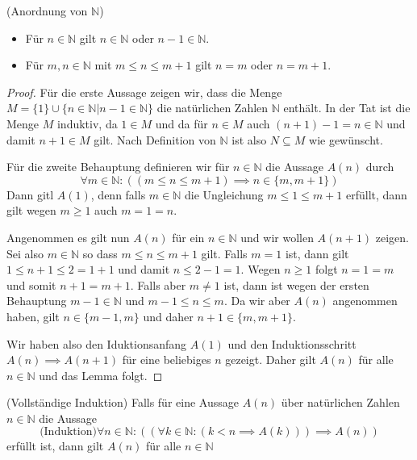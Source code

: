 \documentclass[../Analysis1_script.tex]{subfiles}
\begin{document}
\begin{lemma}{(Anordnung von $\mathbb{N}$)}\label{realn:order}
	\begin{itemize}
		\item Für $n \in \mathbb{N}$ gilt $n \in \mathbb{N}$ oder $n-1 \in \mathbb{N}$.
		\item Für $m, n \in \mathbb{N}$ mit $m \leq n \leq m+1$ gilt $n = m$ oder $n = m+1$.
	\end{itemize}
\end{lemma}

\begin{proof}
	Für die erste Aussage zeigen wir, dass die Menge $M = \{1\} \cup \{n \in \mathbb{N} | n-1 \in \mathbb{N}\}$ die natürlichen Zahlen $\mathbb{N}$ enthält. In der Tat ist die Menge $M$ induktiv, da $1 \in M$ und da für $n \in M$ auch $(n+1)-1 = n \in \mathbb{N}$ und damit $n + 1 \in M$ gilt. Nach Definition von $\mathbb{N}$ ist also $N \subseteq M$ wie gewünscht.
	
	Für die zweite Behauptung definieren wir für $n \in \mathbb{N}$ die Aussage $A(n)$ durch
	\begin{equation}
		\forall m \in \mathbb{N} : ((m \leq n \leq m+1) \implies n \in \{m, m+1\})
	\end{equation}
	Dann gitl $A(1)$, denn falls $m \in \mathbb{N}$ die Ungleichung $m \leq 1 \leq m+1$ erfüllt, dann gilt wegen $m \geq 1$ auch $m = 1 = n$.
	
	Angenommen es gilt nun $A(n)$ für ein $n \in \mathbb{N}$ und wir wollen $A(n+1)$ zeigen. Sei also $m \in \mathbb{N}$ so dass $m \leq n \leq m + 1$ gilt. Falls $m = 1$ ist, dann gilt $1 \leq n + 1 \leq 2 = 1 + 1$ und damit $n \leq 2 - 1 = 1$. Wegen $n \geq 1$ folgt $n = 1 = m$ und somit $n + 1 = m + 1$. Falls aber $m \neq 1$ ist, dann ist wegen der ersten Behauptung $m - 1 \in \mathbb{N}$ und $m - 1 \leq n \leq m$. Da wir aber $A(n)$ angenommen haben, gilt $n \in \{m - 1, m\}$ und daher $n + 1 \in \{m, m + 1\}$.
	
	Wir haben also den Iduktionsanfang $A(1)$ und den Induktionsschritt $A(n) \implies A(n + 1)$ für eine beliebiges $n$ gezeigt. Daher gilt $A(n)$ für alle $n \in  \mathbb{N}$ und das Lemma folgt.
\end{proof}

\begin{proposition}{(Vollständige Induktion)}\label{realn:induktion}
	Falls für eine Aussage $A(n)$ über natürlichen Zahlen $n \in \mathbb{N}$ die Aussage 
	\begin{equation}
		\text{(Induktion)} \forall n \in \mathbb{N}: ((\forall k \in \mathbb{N}: (k < n \implies A(k))) \implies A(n))
	\end{equation}
	erfüllt ist, dann gilt $A(n)$ für alle $n \in \mathbb{N}$
\end{proposition}
\end{document}
